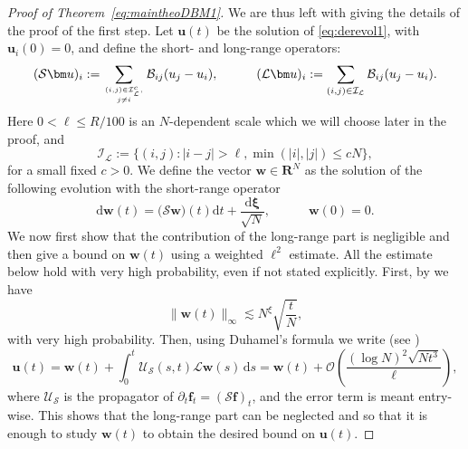 \documentclass[10pt]{amsart}
\numberwithin{equation}{section}
\newcommand{\dif}{\mathrm{d}}
\newcommand{\R}{\mathbf{R}}
\begin{document}
\begin{proof}[Proof of Theorem~\ref{eq:maintheoDBM1}]
We are thus left with giving the details of the proof of the first step. Let ${\bm u}(t)$ be the solution of \eqref{eq:derevol1}, with ${\bm u}_i(0)=0$, and define the short- and long-range operators:
\begin{equation}
(\mathcal{S}{\bm u})_i:=\sum_{(i,j)\in \mathcal{I}_\mathcal{L}^c, \atop j\ne i}\mathcal{B}_{ij}(u_j-u_i), \qquad\quad (\mathcal{L}{\bm u})_i:=\sum_{(i,j)\in \mathcal{I}_\mathcal{L}}\mathcal{B}_{ij}(u_j-u_i).
\end{equation}
Here $0<\ell\le R/100$ is an $N$-dependent scale which we will choose later in the proof, and
\[
\mathcal{I}_\mathcal{L}:=\{(i,j):|i-j|>\ell, \min(|i|,|j|)\le cN\},
\]
for a small fixed $c>0$. We define the vector ${\bm w}\in \R^N$ as the solution of the following evolution with the short-range operator
\begin{equation}
\label{eq:shortstoch}
\dif {\bm w}(t)=\big(\mathcal{S}{\bm w}\big)(t)\dif t+\frac{\dif {\bm \xi}}{\sqrt{N}}, \qquad\quad {\bm w}(0)=0.
\end{equation}
We now first show that the contribution of the long-range part is negligible and then give a bound on ${\bm w}(t)$ using a weighted $\ell^2$ estimate. All the estimate below hold with very high probability, even if not stated explicitly. First, by \cite[Lemma~4.12]{bourgade2024fluctuations} we have
\begin{equation}
\lVert {\bm w}(t)\rVert_\infty\lesssim N^\xi\sqrt{\frac{t}{N}},
\end{equation}
with very high probability. Then, using Duhamel's formula we write (see \cite[Eq.(4.24)--(4.26)]{bourgade2024fluctuations})
\begin{equation}
\label{eq:apprduhamel}
{\bm u}(t)={\bm w}(t)+\int_0^t \mathcal{U}_\mathcal{S}(s,t)\mathcal{L}{\bm w}(s)\, \dif s={\bm w}(t)+\mathcal{O}\left(\frac{(\log N)^2\sqrt{Nt^3}}{\ell}\right),
\end{equation}
where $\mathcal{U}_\mathcal{S}$ is the propagator of $\partial_t {\bm f}_t=(\mathcal{S}{\bm f})_t$, and the error term is meant entry-wise. This shows that the long-range part can be neglected and so that it is enough to study ${\bm w}(t)$ to obtain the desired bound on ${\bm u}(t)$.


\end{proof}
\end{document}
